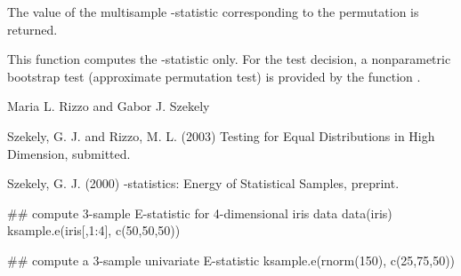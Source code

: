 \begin{Value}
The value of the multisample -statistic corresponding to
the permutation  is returned.\end{Value}
\begin{Note}\relax
This function computes the -statistic only. 
For the test decision,
a nonparametric bootstrap test (approximate permutation test)
is provided by the function .
\end{Note}
\begin{Author}\relax
Maria L. Rizzo  and
Gabor J. Szekely 
\end{Author}
\begin{References}\relax
Szekely, G. J. and Rizzo, M. L. (2003) Testing for Equal
Distributions in High Dimension, submitted.

Szekely, G. J. (2000) -statistics: Energy of 
Statistical Samples, preprint.\end{References}
\begin{SeeAlso}\relax
{}
\end{SeeAlso}
\begin{Examples}
\begin{ExampleCode}
## compute 3-sample E-statistic for 4-dimensional iris data
 data(iris)
 ksample.e(iris[,1:4], c(50,50,50))

## compute a 3-sample univariate E-statistic
 ksample.e(rnorm(150), c(25,75,50))
\end{ExampleCode}
\end{Examples}

